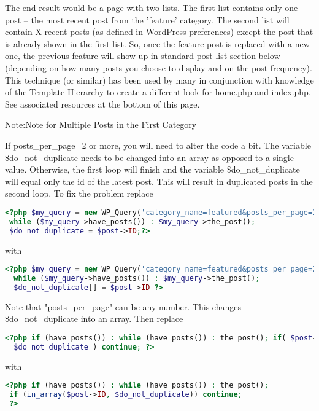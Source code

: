 \begin{compactenum}
The end result would be a page with two lists. The first list contains only one post -- the most recent post from the 'feature' category. The second list will contain X recent posts (as defined in WordPress preferences) except the post that is already shown in the first list. So, once the feature post is replaced with a new one, the previous feature will show up in standard post list section below (depending on how many posts you choose to display and on the post frequency). This technique (or similar) has been used by many in conjunction with knowledge of the Template Hierarchy to create a different look for home.php and index.php. See associated resources at the bottom of this page.

\end{compactenum}

Note:Note for Multiple Posts in the First Category

If posts\_per\_page=2 or more, you will need to alter the code a bit. The variable \$do\_not\_duplicate needs to be changed into an array as opposed to a single value. Otherwise, the first loop will finish and the variable \$do\_not\_duplicate will equal only the id of the latest post. This will result in duplicated posts in the second loop. To fix the problem replace

\begin{lstlisting}[language=PHP]
<?php $my_query = new WP_Query('category_name=featured&posts_per_page=1');
 while ($my_query->have_posts()) : $my_query->the_post();
 $do_not_duplicate = $post->ID;?>
\end{lstlisting}

with

\begin{lstlisting}[language=PHP]
<?php $my_query = new WP_Query('category_name=featured&posts_per_page=2');
  while ($my_query->have_posts()) : $my_query->the_post();
  $do_not_duplicate[] = $post->ID ?>
\end{lstlisting}

Note that "posts\_per\_page" can be any number. This changes \$do\_not\_duplicate into an array. Then replace

\begin{lstlisting}[language=PHP]
<?php if (have_posts()) : while (have_posts()) : the_post(); if( $post->ID ==
  $do_not_duplicate ) continue; ?>
\end{lstlisting}

with

\begin{lstlisting}[language=PHP]
<?php if (have_posts()) : while (have_posts()) : the_post(); 
 if (in_array($post->ID, $do_not_duplicate)) continue;
 ?>
\end{lstlisting}

